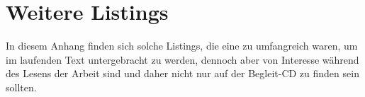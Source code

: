 
\chapter{Weitere Listings} %
\label{cha:more_listing}

  In diesem Anhang finden sich solche Listings, die eine zu umfangreich waren, um im laufenden Text untergebracht zu werden, dennoch aber von Interesse während des Lesens der Arbeit sind und daher nicht nur auf der Begleit-CD zu finden sein sollten.

  
  
  \pagebreak

  
  
  \pagebreak

  
    
